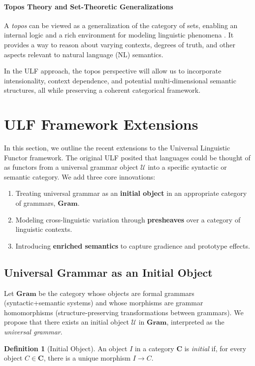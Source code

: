 \documentclass[12pt]{article}
\theoremstyle{plain}
\theoremstyle{definition}
\newtheorem{definition}{Definition}
\begin{document}
\paragraph{Topos Theory and Set-Theoretic Generalizations}
A \emph{topos} can be viewed as a generalization of the category of sets, enabling an internal logic and a rich environment for modeling linguistic phenomena \cite{LambekScott}. It provides a way to reason about varying contexts, degrees of truth, and other aspects relevant to natural language (NL) semantics. 

In the ULF approach, the topos perspective will allow us to incorporate intensionality, context dependence, and potential multi-dimensional semantic structures, all while preserving a coherent categorical framework.

\section{ULF Framework Extensions}
In this section, we outline the recent extensions to the Universal Linguistic Functor framework. The original ULF \cite{original} posited that languages could be thought of as functors from a universal grammar object \(\mathcal{U}\) into a specific syntactic or semantic category. We add three core innovations:
\begin{enumerate}
    \item Treating universal grammar as an \textbf{initial object} in an appropriate category of grammars, \(\mathbf{Gram}\).
    \item Modeling cross-linguistic variation through \textbf{presheaves} over a category of linguistic contexts.
    \item Introducing \textbf{enriched semantics} to capture gradience and prototype effects.
\end{enumerate}

\subsection{Universal Grammar as an Initial Object}
Let \(\mathbf{Gram}\) be the category whose objects are formal grammars (syntactic+semantic systems) and whose morphisms are grammar homomorphisms (structure-preserving transformations between grammars). We propose that there exists an initial object \(\mathcal{U}\) in \(\mathbf{Gram}\), interpreted as the \emph{universal grammar}.

\begin{definition}[Initial Object]
An object \(I\) in a category \(\mathbf{C}\) is \emph{initial} if, for every object \(C \in \mathbf{C}\), there is a unique morphism \(I \to C\).
\end{definition}
\end{document}
